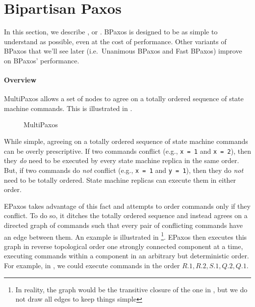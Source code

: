 \section{Bipartisan Paxos}
In this section, we describe , or .
BPaxos is designed to be as simple to understand as possible, even at the cost
of performance. Other variants of BPaxos that we'll see later (i.e.\ Unanimous
BPaxos and Fast BPaxos) improve on BPaxos' performance.

\paragraph{Overview}
MultiPaxos allows a set of nodes to agree on a totally ordered sequence of
state machine commands. This is illustrated in .

\begin{figure}[h]
  \centering
  \caption{MultiPaxos}
\end{figure}

While simple, agreeing on a totally ordered sequence of state machine commands
can be overly prescriptive. If two commands conflict (e.g., \texttt{x = 1} and
\texttt{x = 2}), then they \emph{do} need to be executed by every state machine
replica in the same order. But, if two commands do \emph{not} conflict (e.g.,
\texttt{x = 1} and \texttt{y = 1}), then they do \emph{not} need to be totally
ordered.  State machine replicas can execute them in either order.

EPaxos takes advantage of this fact and attempts to order commands only if they
conflict. To do so, it ditches the totally ordered sequence and instead agrees
on a directed graph of commands such that every pair of conflicting commands
have an edge between them. An example is illustrated in %
\footnote{%
  In reality, the graph would be the transitive closure of the one in
  , but we do not draw all edges to keep things simple
}.
EPaxos then executes this graph in reverse topological order one strongly
connected component at a time, executing commands within a component in an
arbitrary but deterministic order. For example, in , we
could execute commands in the order $R.1, R.2, S.1, Q.2, Q.1$.

